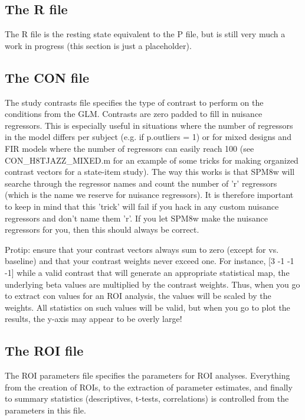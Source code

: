\documentclass[12pt]{article}
\begin{document}
\subsection{The R file}
The R file is the resting state equivalent to the P file, but is still very much a work in progress (this section is just a placeholder). 

\subsection{The CON file}
The study contrasts file specifies the type of contrast to perform on the conditions from the GLM. Contrasts are zero padded to fill in nuisance regressors. This is especially useful in situations where the number of regressors in the model differs per subject (e.g. if p.outliers = 1) or for mixed designs and FIR models where the number of regressors can easily reach 100 (see CON\_H8TJAZZ\_MIXED.m for an example of some tricks for making organized contrast vectors for a state-item study). The way this works is that SPM8w will searche through the regressor names and count the number of 'r' regressors (which is the name we reserve for nuisance regressors). It is therefore important to keep in mind that this 'trick' will fail if you hack in any custom nuisance regressors and don’t name them 'r'. If you let SPM8w make the nuisance regressors for you, then this should always be correct. 

Protip: ensure that your contrast vectors always sum to zero (except for vs. baseline) and that your contrast weights never exceed one. For instance, [3 -1 -1 -1] while a valid contrast that will generate an appropriate statistical map, the underlying beta values are multiplied by the contrast weights. Thus, when you go to extract con values for an ROI analysis, the values will be scaled by the weights. All statistics on such values will be valid, but when you go to plot the results, the y-axis may appear to be overly large! 




\subsection{The ROI file}
The ROI parameters file specifies the parameters for ROI analyses. Everything from the creation of  ROIs, to the extraction of parameter estimates, and finally to summary statistics (descriptives, t-tests, correlations) is controlled from the parameters in this file.  
\end{document}
